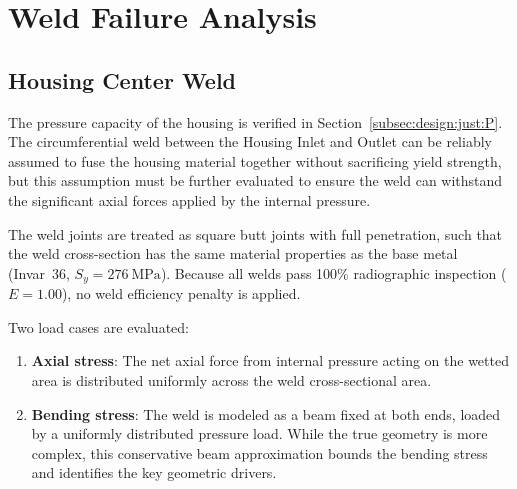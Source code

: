 \documentclass[12pt, letterpaper]{report}%
\newcounter{mycounter}           %
\newcounter{sub}[mycounter]      %
\begin{document}
	\section{Weld Failure Analysis}
	\label{sec:DFMEA:weld}
		\subsection{Housing Center Weld}
		\label{subsec:DFMEA:weld:main}

			The pressure capacity of the housing is verified in Section~\ref{subsec:design:just:P}. The circumferential weld between the Housing Inlet and Outlet can be reliably assumed to
			fuse the housing material together without sacrificing yield strength, but this assumption must be further evaluated to ensure the weld can withstand the significant axial forces applied by the internal pressure.

			The weld joints are treated as square butt joints with full penetration, such that 
			the weld cross-section has the same material properties as the base metal 
			(Invar~36, $S_y = \SI{276}{\mega\pascal}$). Because all welds pass 100\% 
			radiographic inspection ($E = 1.00$), no weld efficiency penalty is 
			applied\cite[Table~302.3.4]{ref_asme_b313}.

			Two load cases are evaluated:
			\begin{enumerate}[label=\alph*.]
				\item \textbf{Axial stress}: The net axial force from internal pressure acting 
					on the wetted area is distributed uniformly across the weld cross-sectional 
					area\cite[Eq.~1-6]{ref_Hibbeler}.
				\item \textbf{Bending stress}: The weld is modeled as a beam fixed at both 
					ends, loaded by a uniformly distributed pressure load. While the true 
					geometry is more complex, this conservative beam approximation bounds the 
					bending stress and identifies the key geometric drivers\cite{ref_beam}. 
			\end{enumerate}
\end{document}

